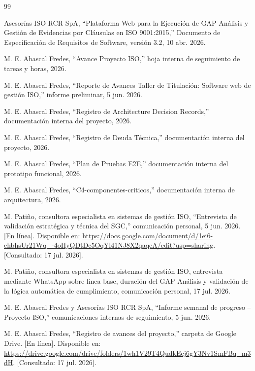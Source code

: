 \documentclass[final]{udpthesis}
\begin{document}
\renewcommand{\bibname}{Referencias}
\begin{thebibliography}{99}

Asesorías ISO RCR SpA, ``Plataforma Web para la Ejecución de GAP Análisis y Gestión de Evidencias por Cláusulas en ISO 9001:2015,'' Documento de Especificación de Requisitos de Software, versión 3.2, 10 abr. 2026.

M. E. Abascal Fredes, ``Avance Proyecto ISO,'' hoja interna de seguimiento de tareas y horas, 2026.

M. E. Abascal Fredes, ``Reporte de Avances Taller de Titulación: Software web de gestión ISO,'' informe preliminar, 5 jun. 2026.

M. E. Abascal Fredes, ``Registro de Architecture Decision Records,'' documentación interna del proyecto, 2026.

M. E. Abascal Fredes, ``Registro de Deuda Técnica,'' documentación interna del proyecto, 2026.

M. E. Abascal Fredes, ``Plan de Pruebas E2E,'' documentación interna del prototipo funcional, 2026.

M. E. Abascal Fredes, ``C4-componentes-criticos,'' documentación interna de arquitectura, 2026.

M. Patiño, consultora especialista en sistemas de gestión ISO, ``Entrevista de validación estratégica y técnica del SGC,'' comunicación personal, 5 jun. 2026. [En línea]. Disponible en: \url{https://docs.google.com/document/d/1ei6-ehbhsUr21Wq_-4oHyQDtDc5OqYl41NJ8X2qaqeA/edit?usp=sharing}. [Consultado: 17 jul. 2026].

M. Patiño, consultora especialista en sistemas de gestión ISO, entrevista mediante WhatsApp sobre línea base, duración del GAP Análisis y validación de la lógica automática de cumplimiento, comunicación personal, 17 jul. 2026.

M. E. Abascal Fredes y Asesorías ISO RCR SpA, ``Informe semanal de progreso -- Proyecto ISO,'' comunicaciones internas de seguimiento, 5 jun. 2026.

M. E. Abascal Fredes, ``Registro de avances del proyecto,'' carpeta de Google Drive. [En línea]. Disponible en: \url{https://drive.google.com/drive/folders/1wh1V29T4QudkEej6gY3Nv1SmFBq_m3dH}. [Consultado: 17 jul. 2026].


\end{thebibliography}
\end{document}
